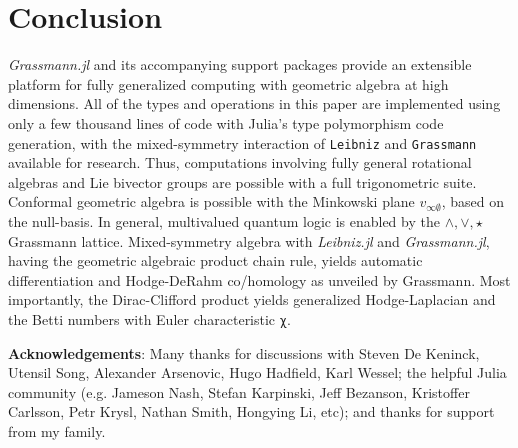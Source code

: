 \documentclass{juliacon}
\begin{document}
\section{Conclusion}

\textit{Grassmann.jl} and its accompanying support packages provide an extensible platform for fully generalized computing with geometric algebra at high dimensions.
All of the types and operations in this paper are implemented using only a few thousand lines of code with Julia's type polymorphism code generation, with the mixed-symmetry interaction of \verb`Leibniz` and \verb`Grassmann` available for research.
Thus, computations involving fully general rotational algebras and Lie bivector groups are possible with a full trigonometric suite. %
Conformal geometric algebra is possible with the Minkowski plane $v_{\infty\emptyset}$, based on the null-basis.
In general, multivalued quantum logic is enabled by the $\wedge,\vee,\star$ Grassmann lattice.
Mixed-symmetry algebra with \textit{Leibniz.jl} and \textit{Grassmann.jl}, having the geometric algebraic product chain rule, yields automatic differentiation and Hodge-DeRahm co/homology  as unveiled by Grassmann.
Most importantly, the Dirac-Clifford product yields generalized Hodge-Laplacian and the Betti numbers with Euler characteristic \verb`χ`.

\textbf{Acknowledgements}: Many thanks for discussions with Steven De Keninck, Utensil Song, Alexander Arsenovic, Hugo Hadfield, Karl Wessel; the helpful Julia community (e.g. Jameson Nash, Stefan Karpinski, Jeff Bezanson, Kristoffer Carlsson, Petr Krysl, Nathan Smith, Hongying Li, etc); and thanks for support from my family.

\end{document}
